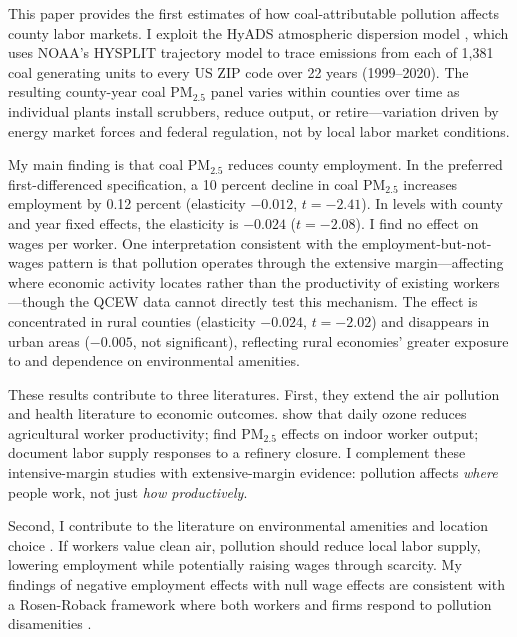 \documentclass[12pt]{article}
\begin{document}
This paper provides the first estimates of how coal-attributable pollution affects county labor markets. I exploit the HyADS atmospheric dispersion model \citep{henneman2019hyads}, which uses NOAA's HYSPLIT trajectory model to trace emissions from each of 1,381 coal generating units to every US ZIP code over 22 years (1999--2020). The resulting county-year coal PM$_{2.5}$ panel varies within counties over time as individual plants install scrubbers, reduce output, or retire---variation driven by energy market forces and federal regulation, not by local labor market conditions.

My main finding is that coal PM$_{2.5}$ reduces county employment. In the preferred first-differenced specification, a 10 percent decline in coal PM$_{2.5}$ increases employment by 0.12 percent (elasticity $-0.012$, $t=-2.41$). In levels with county and year fixed effects, the elasticity is $-0.024$ ($t=-2.08$). I find no effect on wages per worker. One interpretation consistent with the employment-but-not-wages pattern is that pollution operates through the extensive margin---affecting where economic activity locates rather than the productivity of existing workers---though the QCEW data cannot directly test this mechanism. The effect is concentrated in rural counties (elasticity $-0.024$, $t=-2.02$) and disappears in urban areas ($-0.005$, not significant), reflecting rural economies' greater exposure to and dependence on environmental amenities.

These results contribute to three literatures. First, they extend the air pollution and health literature \citep{deryugina2019mortality, currie2005air, currie2011traffic} to economic outcomes. \citet{graff2012impact} show that daily ozone reduces agricultural worker productivity; \citet{chang2016effect} find PM$_{2.5}$ effects on indoor worker output; \citet{hanna2015effect} document labor supply responses to a refinery closure. I complement these intensive-margin studies with extensive-margin evidence: pollution affects \textit{where} people work, not just \textit{how productively}.

Second, I contribute to the literature on environmental amenities and location choice \citep{roback1982wages, albouy2012amenities}. If workers value clean air, pollution should reduce local labor supply, lowering employment while potentially raising wages through scarcity. My findings of negative employment effects with null wage effects are consistent with a Rosen-Roback framework where both workers and firms respond to pollution disamenities \citep{chay2005does, banzhaf2012sorting}.
\end{document}
